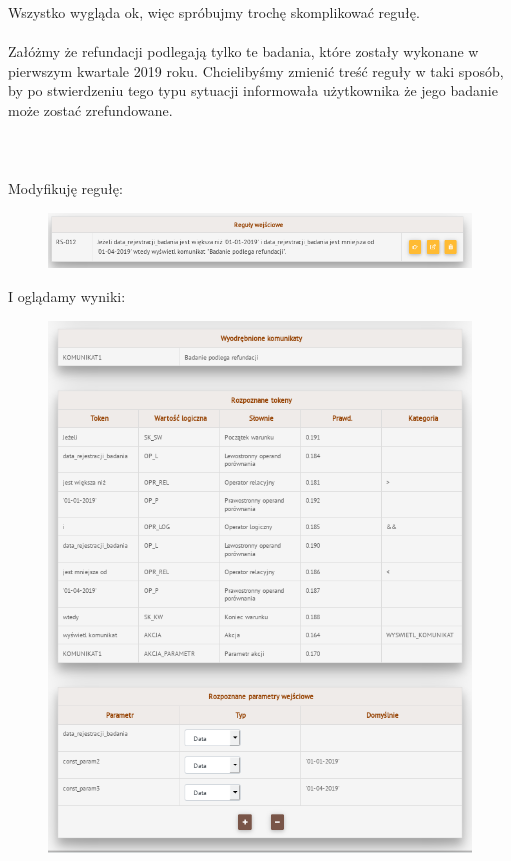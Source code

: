 Wszystko wygląda ok, więc spróbujmy trochę skomplikować regułę. 

\paragraph{}
Załóżmy że refundacji podlegają tylko te badania, które zostały wykonane w pierwszym kwartale 2019 roku. Chcielibyśmy zmienić treść reguły w taki sposób, by po stwierdzeniu tego typu sytuacji informowała użytkownika że jego badanie może zostać zrefundowane.
\\ \\
\\ \\
Modyfikuję regułę:
\begin{figure}[H]
	\centering
	\includegraphics[scale=0.8]{img/app-eksperymenty/p2-1.png}
\end{figure}
I oglądamy wyniki:
\begin{figure}[H]
	\centering
	\includegraphics[scale=0.8]{img/app-eksperymenty/p2-2.png}
\end{figure}
